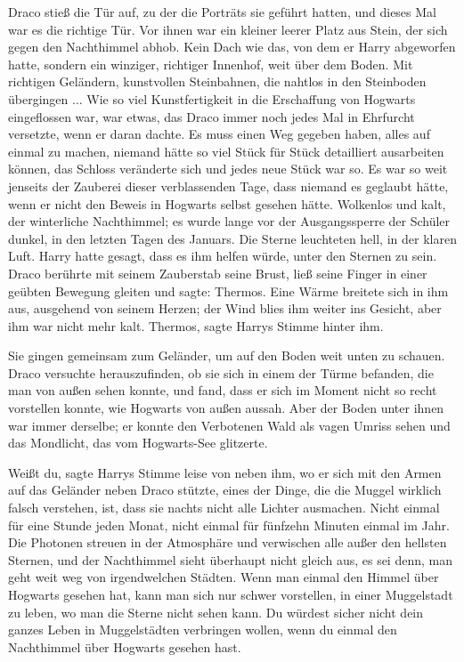 Draco stieß die Tür auf, zu der die Porträts sie geführt hatten, und dieses Mal
war es die richtige Tür. Vor ihnen war ein kleiner leerer Platz aus Stein, der
sich gegen den Nachthimmel abhob. Kein Dach wie das, von dem er Harry abgeworfen
hatte, sondern ein winziger, richtiger Innenhof, weit über dem Boden. Mit
richtigen Geländern, kunstvollen Steinbahnen, die nahtlos in den Steinboden
übergingen ... Wie so viel Kunstfertigkeit in die Erschaffung von Hogwarts
eingeflossen war, war etwas, das Draco immer noch jedes Mal in Ehrfurcht
versetzte, wenn er daran dachte. Es muss einen Weg gegeben haben, alles auf
einmal zu machen, niemand hätte so viel Stück für Stück detailliert ausarbeiten
können, das Schloss veränderte sich und jedes neue Stück war so. Es war so weit
jenseits der Zauberei dieser verblassenden Tage, dass niemand es geglaubt hätte,
wenn er nicht den Beweis in Hogwarts selbst gesehen hätte. Wolkenlos und kalt,
der winterliche Nachthimmel; es wurde lange vor der Ausgangssperre der Schüler
dunkel, in den letzten Tagen des Januars. Die Sterne leuchteten hell, in der
klaren Luft. Harry hatte gesagt, dass es ihm helfen würde, unter den Sternen zu
sein. Draco berührte mit seinem Zauberstab seine Brust, ließ seine Finger in
einer geübten Bewegung gleiten und sagte: \glqq{}Thermos.\grqq{} Eine Wärme
breitete sich in ihm aus, ausgehend von seinem Herzen; der Wind blies ihm weiter
ins Gesicht, aber ihm war nicht mehr kalt. \glqq{}Thermos\grqq{}, sagte Harrys
Stimme hinter ihm.

Sie gingen gemeinsam zum Geländer, um auf den Boden weit unten zu schauen. Draco
versuchte herauszufinden, ob sie sich in einem der Türme befanden, die man von
außen sehen konnte, und fand, dass er sich im Moment nicht so recht vorstellen
konnte, wie Hogwarts von außen aussah. Aber der Boden unter ihnen war immer
derselbe; er konnte den Verbotenen Wald als vagen Umriss sehen und das
Mondlicht, das vom Hogwarts-See glitzerte.

\glqq{}Weißt du\grqq{}, sagte Harrys Stimme leise von neben ihm, wo er sich mit
den Armen auf das Geländer neben Draco stützte, \glqq{}eines der Dinge, die die
Muggel wirklich falsch verstehen, ist, dass sie nachts nicht alle Lichter
ausmachen. Nicht einmal für eine Stunde jeden Monat, nicht einmal für fünfzehn
Minuten einmal im Jahr. Die Photonen streuen in der Atmosphäre und verwischen
alle außer den hellsten Sternen, und der Nachthimmel sieht überhaupt nicht
gleich aus, es sei denn, man geht weit weg von irgendwelchen Städten. Wenn man
einmal den Himmel über Hogwarts gesehen hat, kann man sich nur schwer
vorstellen, in einer Muggelstadt zu leben, wo man die Sterne nicht sehen kann.
Du würdest sicher nicht dein ganzes Leben in Muggelstädten verbringen wollen,
wenn du einmal den Nachthimmel über Hogwarts gesehen hast.\grqq{}

